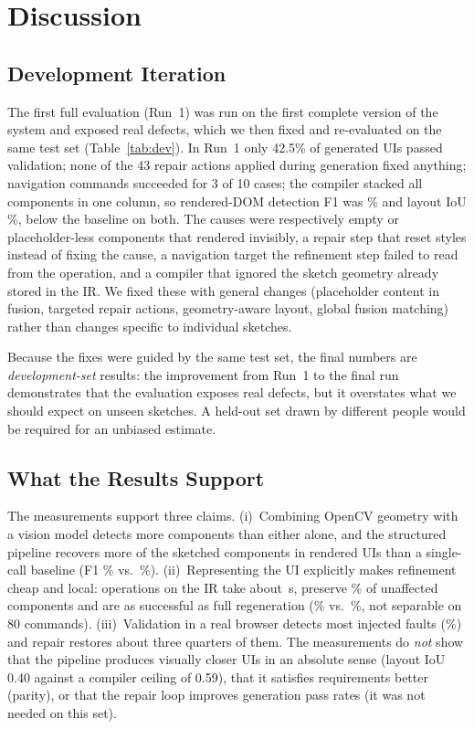 \section{Discussion}
\subsection{Development Iteration}
\label{sec:dev}
The first full evaluation (Run~1) was run on the first complete version of the system and exposed real defects, which we then fixed and re-evaluated on the same test set (Table~\ref{tab:dev}). In Run~1 only 42.5\% of generated UIs passed validation; none of the 43 repair actions applied during generation fixed anything; navigation commands succeeded for 3 of 10 cases; the compiler stacked all components in one column, so rendered-DOM detection F1 was \DevComponentDetectionFODomPipeline{}\% and layout IoU \DevVisualSimilarityLayoutIouPipeline{}\%, below the baseline on both. The causes were respectively empty or placeholder-less components that rendered invisibly, a repair step that reset styles instead of fixing the cause, a navigation target the refinement step failed to read from the operation, and a compiler that ignored the sketch geometry already stored in the IR. We fixed these with general changes (placeholder content in fusion, targeted repair actions, geometry-aware layout, global fusion matching) rather than changes specific to individual sketches.

Because the fixes were guided by the same test set, the final numbers are \emph{development-set} results: the improvement from Run~1 to the final run demonstrates that the evaluation exposes real defects, but it overstates what we should expect on unseen sketches. A held-out set drawn by different people would be required for an unbiased estimate.



\subsection{What the Results Support}
The measurements support three claims. (i)~Combining OpenCV geometry with a vision model detects more components than either alone, and the structured pipeline recovers more of the sketched components in rendered UIs than a single-call baseline (F1 \ComponentDetectionFODomPipeline{}\% vs.\ \ComponentDetectionFODomBaseline{}\%). (ii)~Representing the UI explicitly makes refinement cheap and local: operations on the IR take about \ModificationTimeMsPipeline{}\,s, preserve \PreservationRatePipeline{}\% of unaffected components and are as successful as full regeneration (\RefinementSuccessRatePipeline{}\% vs.\ \RefinementSuccessRateBaseline{}\%, not separable on 80 commands). (iii)~Validation in a real browser detects most injected faults (\FaultDetectionRatePipeline{}\%) and repair restores about three quarters of them. The measurements do \emph{not} show that the pipeline produces visually closer UIs in an absolute sense (layout IoU 0.40 against a compiler ceiling of 0.59), that it satisfies requirements better (parity), or that the repair loop improves generation pass rates (it was not needed on this set).

